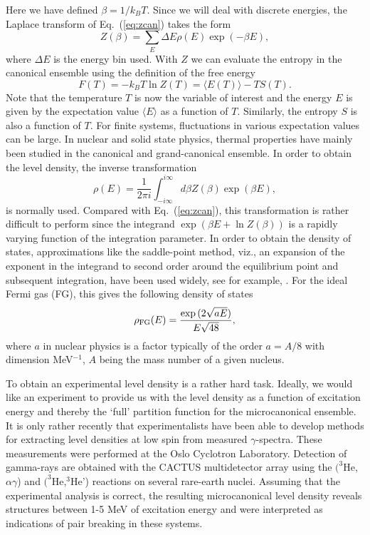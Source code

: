 \documentclass[rmp,preprint,aps,floatfix]{revtex4}
\begin{document}
Here we have defined $\beta=1/k_BT$. Since we will 
deal with discrete energies, the 
Laplace transform of Eq.\ (\ref{eq:zcan}) takes the form
\begin{equation}
         Z(\beta)=\sum_E \Delta E\rho(E)\exp{(-\beta E)},
         \label{eq:zactual}
\end{equation}
where $\Delta E$ is the energy bin used.
With $Z$ we can evaluate the 
entropy in the canonical ensemble using the definition of the 
free energy 
\begin{equation}
     F(T)= -k_B T \ln Z(T)=\langle E(T)\rangle - TS(T).
\end{equation}
Note that the temperature $T$ is now the variable of 
interest and the energy $E$ is given by the expectation 
value $\langle E\rangle$ as a function of $T$. Similarly, 
the entropy $S$ is also a function of $T$.
For finite systems, fluctuations in various 
expectation values can be large.
In nuclear and solid state physics, thermal properties have 
mainly been studied in the canonical and grand-canonical ensemble. 
In order to obtain the level density, the inverse transformation 
\begin{equation}
      \rho(E) =\frac{1}{2\pi i}\int_{-i\infty}^{i\infty}
 d\beta Z(\beta) \exp{(\beta E)},
      \label{eq:zbigcan}
\end{equation}
is normally used. Compared with Eq.\ (\ref{eq:zcan}), this 
transformation is rather difficult to perform since 
the integrand $\exp{\left(\beta E+ \ln Z(\beta)\right)}$ is a 
rapidly varying function of the integration parameter. In order to obtain 
the density of states, approximations like the saddle-point 
method, viz., an expansion of the exponent in the integrand 
to second order around the equilibrium point and subsequent integration, 
have been used widely,
see for example,  \cite{kdl97,yoram,WK00}. 
For the ideal Fermi gas (FG), this gives the following density of states
\begin{equation}
      \rho_{\rm FG}(E)=\frac{\exp{(2\sqrt{aE})}}{E\sqrt{48}},
      \label{eq:omegaideal}
\end{equation}
where $a$ in nuclear physics is a factor 
typically of the order $a=A/8$ with dimension 
MeV$^{-1}$, $A$ being the mass number of a given nucleus. 



To obtain an experimental level density is a rather hard task.
Ideally, we would like an experiment to provide us with the level 
density as a function of excitation energy and thereby 
the `full' partition function for the microcanonical ensemble. 
It is only rather recently that 
experimentalists have been able to develop methods 
\cite{oslo1,oslo2} for extracting level densities at low spin from
measured $\gamma$-spectra. 
These measurements were performed at the Oslo 
Cyclotron Laboratory. Detection of gamma-rays are obtained with the
CACTUS multidetector array \cite{oslo3} using the $(^3$He,$\alpha \gamma$)
and $(^3$He,$^3$He')
reactions on several rare-earth nuclei.
Assuming that the
experimental analysis is correct,   
the resulting microcanonical 
level density reveals structures between 1-5 MeV of excitation energy
and were interpreted as indications of pair breaking in these systems. 
\end{document}
